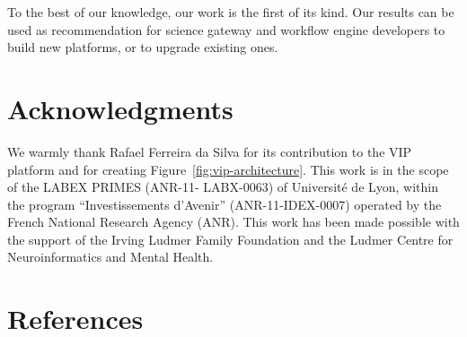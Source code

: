 \documentclass[preprint,3p,twocolumn]{elsarticle}
\begin{document}
To the best of our knowledge, our work is the first of its kind. Our
results can be used as recommendation for science gateway and workflow
engine developers to build new platforms, or to upgrade existing ones.

\section{Acknowledgments}

We warmly thank Rafael Ferreira da Silva for its contribution to the
VIP platform and for creating Figure~\ref{fig:vip-architecture}. This
work is in the scope of the LABEX PRIMES (ANR-11- LABX-0063) of
Universit\'e de Lyon, within the program ``Investissements d’Avenir''
(ANR-11-IDEX-0007) operated by the French National Research Agency
(ANR). This work has been made possible with the support of the Irving
Ludmer Family Foundation and the Ludmer Centre for Neuroinformatics
and Mental Health.

\section*{References}

 

\end{document}
